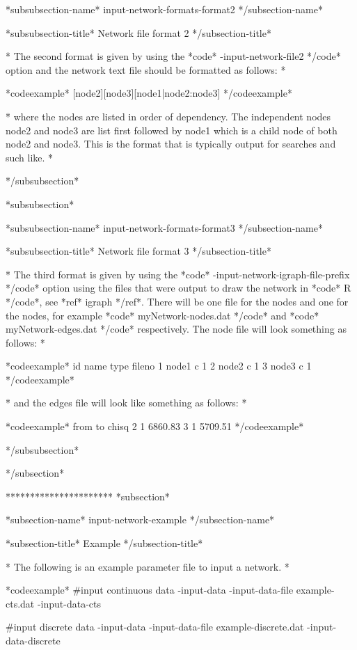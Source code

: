 *subsubsection-name* input-network-formats-format2 */subsection-name*

*subsubsection-title* Network file format 2 */subsection-title*

* The second format is given by using the *code* -input-network-file2 */code* option and the network text file should be formatted as follows: *

*codeexample* [node2][node3][node1|node2:node3] */codeexample*

* where the nodes are listed in order of dependency. The independent nodes node2 and node3 are list first followed by node1 which is a child node of both node2 and node3. This is the format that is typically output for searches and such like. *


*/subsubsection*


*subsubsection*

*subsubsection-name* input-network-formats-format3 */subsection-name*

*subsubsection-title* Network file format 3 */subsection-title*

* The third format is given by using the *code* -input-network-igraph-file-prefix */code* option using the files that were output to draw the network in *code* R */code*, see *ref* igraph */ref*. There will be one file for the nodes and one for the nodes, for example *code* myNetwork-nodes.dat */code* and *code* myNetwork-edges.dat */code* respectively. The node file will look something as follows: *

*codeexample* id name type fileno 1 node1 c 1 2 node2 c 1 3 node3 c 1 */codeexample*

* and the edges file will look like something as follows: *

*codeexample* from to chisq 2 1 6860.83 3 1 5709.51 */codeexample*

*/subsubsection*

*/subsection*

********************** *subsection*

*subsection-name* input-network-example */subsection-name*

*subsection-title* Example */subsection-title*

* The following is an example parameter file to input a network. *

*codeexample* #input continuous data -input-data -input-data-file example-cts.dat -input-data-cts

#input discrete data -input-data -input-data-file example-discrete.dat -input-data-discrete

